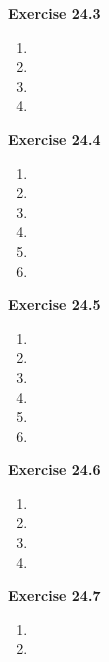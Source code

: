 




\textbf{Exercise 24.3}
\begin{enumerate}
    \item 
    \item 
    \item 
    \item 
\end{enumerate}

\textbf{Exercise 24.4}
\begin{enumerate}
    \item 
    \item 
    \item 
    \item 
    \item 
    \item 
\end{enumerate}

\textbf{Exercise 24.5}
\begin{enumerate}
    \item 
    \item 
    \item 
    \item 
    \item 
    \item 
\end{enumerate}

\textbf{Exercise 24.6}
\begin{enumerate}
    \item 
    \item 
    \item 
    \item 
\end{enumerate}

\textbf{Exercise 24.7}
\begin{enumerate}
    \item 
    \item 
\end{enumerate}

